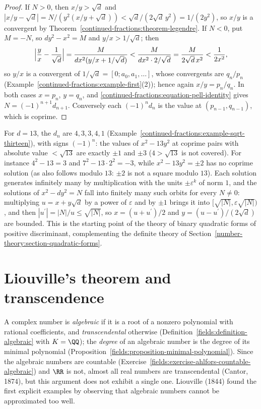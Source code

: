 \begin{proof}
If $N > 0$, then $x/y > \sqrt d$ and $|x/y - \sqrt d| = N/(y^2(x/y + \sqrt d)) < \sqrt d/(2\sqrt d\,y^2) = 1/(2y^2)$, so $x/y$ is a convergent by Theorem~\ref{continued-fractions:theorem-legendre}.
If $N < 0$, put $M = -N$, so $dy^2 - x^2 = M$ and $y/x > 1/\sqrt d$; then
\[
\Bigl|\frac yx - \frac{1}{\sqrt d}\Bigr| = \frac{M}{dx^2(y/x + 1/\sqrt d)} < \frac{M}{dx^2 \cdot 2/\sqrt d} = \frac{M}{2\sqrt d\,x^2} < \frac{1}{2x^2},
\]
so $y/x$ is a convergent of $1/\sqrt d = [0; a_0, a_1, \ldots]$, whose convergents are $q_n/p_n$ (Example~\ref{continued-fractions:example-first}(2)); hence again $x/y = p_n/q_n$. In both cases
$x = p_n$, $y = q_n$, and \eqref{continued-fractions:equation-pell-identity} gives $N = (-1)^{n+1}d_{n+1}$. Conversely each $(-1)^nd_n$ is the value at $(p_{n-1}, q_{n-1})$, which is coprime.
\end{proof}

\begin{example}\label{continued-fractions:example-small-norms}
For $d = 13$, the $d_n$ are $4, 3, 3, 4, 1$ (Example~\ref{continued-fractions:example-sqrt-thirteen}), with signs $(-1)^n$: the values of $x^2 - 13y^2$ at coprime pairs with absolute value
$< \sqrt{13}$ are exactly $\pm 1$ and $\pm 3$ ($4 > \sqrt{13}$ is not covered). For instance $4^2 - 13 = 3$ and $7^2 - 13 \cdot 2^2 = -3$, while $x^2 - 13y^2 = \pm 2$ has no coprime solution (as also
follows modulo $13$: $\pm 2$ is not a square modulo $13$). Each solution generates infinitely many by multiplication with the units $\pm\varepsilon^k$ of norm $1$, and the solutions of
$x^2 - dy^2 = N$ fall into finitely many such orbits for every $N \neq 0$: multiplying $u = x + y\sqrt d$ by a power of $\varepsilon$ and by $\pm 1$ brings it into $[\sqrt{|N|}, \varepsilon\sqrt{|N|})$,
and then $|u^{\prime}| = |N|/u \leq \sqrt{|N|}$, so $x = (u + u^{\prime})/2$ and $y = (u - u^{\prime})/(2\sqrt d)$ are bounded. This is the starting point of the theory of binary quadratic forms of positive discriminant, complementing the definite theory of
Section~\ref{number-theory:section-quadratic-forms}.
\end{example}

\section{Liouville's theorem and transcendence}\label{continued-fractions:section-transcendence}

A complex number is \emph{algebraic} if it is a root of a nonzero polynomial with rational coefficients, and \emph{transcendental} otherwise (Definition~\ref{fields:definition-algebraic} with
$K = \QQ$); the \emph{degree} of an algebraic number is the degree of its minimal polynomial (Proposition~\ref{fields:proposition-minimal-polynomial}). Since the algebraic numbers are countable
(Exercise~\ref{fields:exercise-ahlfors-countable-algebraic}) and $\RR$ is not, almost all real numbers are transcendental (Cantor, 1874), but this argument does not exhibit a single one. Liouville
(1844) found the first explicit examples by observing that algebraic numbers cannot be approximated too well.

